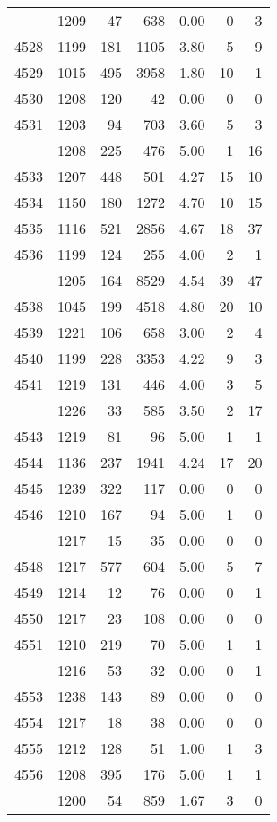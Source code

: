 \documentclass[
]{article}
\begin{document}
\begin{table}
\begin{tabular}[t]{lrrrrrr}
\addlinespace
4527 & 1209 & 47 & 638 & 0.00 & 0 & 3\\
4528 & 1199 & 181 & 1105 & 3.80 & 5 & 9\\
4529 & 1015 & 495 & 3958 & 1.80 & 10 & 1\\
4530 & 1208 & 120 & 42 & 0.00 & 0 & 0\\
4531 & 1203 & 94 & 703 & 3.60 & 5 & 3\\
\addlinespace
4532 & 1208 & 225 & 476 & 5.00 & 1 & 16\\
4533 & 1207 & 448 & 501 & 4.27 & 15 & 10\\
4534 & 1150 & 180 & 1272 & 4.70 & 10 & 15\\
4535 & 1116 & 521 & 2856 & 4.67 & 18 & 37\\
4536 & 1199 & 124 & 255 & 4.00 & 2 & 1\\
\addlinespace
4537 & 1205 & 164 & 8529 & 4.54 & 39 & 47\\
4538 & 1045 & 199 & 4518 & 4.80 & 20 & 10\\
4539 & 1221 & 106 & 658 & 3.00 & 2 & 4\\
4540 & 1199 & 228 & 3353 & 4.22 & 9 & 3\\
4541 & 1219 & 131 & 446 & 4.00 & 3 & 5\\
\addlinespace
4542 & 1226 & 33 & 585 & 3.50 & 2 & 17\\
4543 & 1219 & 81 & 96 & 5.00 & 1 & 1\\
4544 & 1136 & 237 & 1941 & 4.24 & 17 & 20\\
4545 & 1239 & 322 & 117 & 0.00 & 0 & 0\\
4546 & 1210 & 167 & 94 & 5.00 & 1 & 0\\
\addlinespace
4547 & 1217 & 15 & 35 & 0.00 & 0 & 0\\
4548 & 1217 & 577 & 604 & 5.00 & 5 & 7\\
4549 & 1214 & 12 & 76 & 0.00 & 0 & 1\\
4550 & 1217 & 23 & 108 & 0.00 & 0 & 0\\
4551 & 1210 & 219 & 70 & 5.00 & 1 & 1\\
\addlinespace
4552 & 1216 & 53 & 32 & 0.00 & 0 & 1\\
4553 & 1238 & 143 & 89 & 0.00 & 0 & 0\\
4554 & 1217 & 18 & 38 & 0.00 & 0 & 0\\
4555 & 1212 & 128 & 51 & 1.00 & 1 & 3\\
4556 & 1208 & 395 & 176 & 5.00 & 1 & 1\\
\addlinespace
4557 & 1200 & 54 & 859 & 1.67 & 3 & 0\\

\end{tabular}
\end{table}
\end{document}
